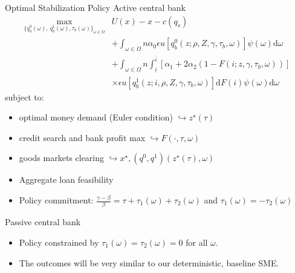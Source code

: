 \documentclass[10pt,english,slidetop,compress,
              blue,mathserif,color=option]{beamer}
\theoremstyle{plain}
\theoremstyle{definition}
\begin{document}
\begin{frame}[allowframebreaks]{Optimal Stabilization Policy}
   \alert{Active central bank} 
   \begin{equation*}
    \begin{split}
    \max_{\{ q_{b}^{0}(\omega),\ q_{b}^{1}(\omega),\tau_{b}(\omega)\}_{\omega \in \Omega}} 
    & 
    U\left(x\right)-x 
    - c(q_{s})
    \\
    &+ \int_{\omega\in\Omega}n\alpha_{0}\epsilon u\left[q_{b}^{0}\left(z;\rho,Z,\gamma,\tau_{b},\omega\right)\right]
    \psi\left(\omega\right)\text{d}\omega 
    \\
    &+ \int_{\omega\in\Omega}n
    \int_{\underline{i}}^{\overline{i}}
    \left[\alpha_{1}+2\alpha_{2}\left(1-F\left(i;z,\gamma,\tau_{b},\omega\right) \right)\right]
    \\
&\times \epsilon u\left[q_{b}^{1}\left(z;i,\rho,Z,\gamma,\tau_{b},\omega\right)\right]
    \text{d}F\left(i\right)\psi\left(\omega\right)\text{d}\omega
    \end{split}
    \label{eq:Active CB problem}
\end{equation*}
subject to:
\begin{itemize}
  \item optimal money demand (Euler condition) $\hookrightarrow z^{\star}(\tau)$
  \item credit search and bank profit max $\hookrightarrow F(\cdot, \tau, \omega)$
  \item goods markets clearing $\hookrightarrow x^{\star}, (q^{0}, q^{1})(z^{\star}(\tau), \omega)$
  \item Aggregate loan feasibility
  \item Policy commitment: 
    $\frac{\gamma-\beta}{\beta} = \tau + \tau_{1}(\omega) + \tau_{2}(\omega)$ and 
    $
    \tau_{1}(\omega) = -\tau_{2}(\omega)
    $
\end{itemize}

\break

\alert{Passive central bank}

\begin{itemize}

  \item Policy constrained by $\tau_{1}\left(\omega\right) = \tau_{2}\left(\omega\right) = 0$ for all $\omega$. 

  \item The outcomes will be very similar to our deterministic, baseline SME.

\end{itemize}




\end{frame}
\end{document}
